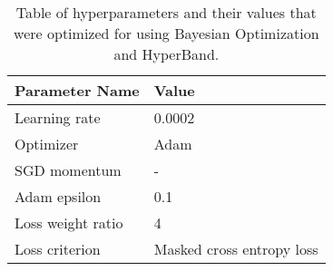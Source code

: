 \begin{table}[]
	\centering
\begin{tabular}{@{}lp{2.3cm}}
\toprule
Parameter Name    & Value     \\ \midrule
Learning rate     & 0.0002    \\
Optimizer         & Adam      \\
SGD momentum      & -         \\
Adam epsilon      & 0.1       \\
Loss weight ratio & 4         \\
Loss criterion    & Masked cross entropy loss\\ \bottomrule
\end{tabular}
\caption[Hyperparameter Optimization Results]{Table of hyperparameters and their values that were optimized for using Bayesian Optimization and HyperBand. }
\label{tab:hyperparameterresults}
\end{table}